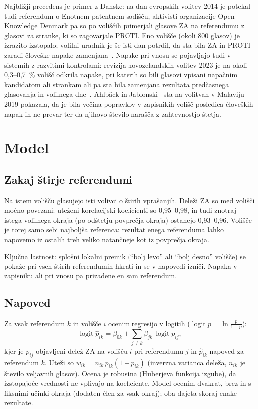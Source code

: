 \documentclass[11pt,a4paper]{article}
\begin{document}
Najbližji precedens je primer z Danske: na dan evropskih volitev 2014 je potekal tudi referendum o Enotnem patentnem sodišču, aktivisti organizacije Open Knowledge Denmark pa so po voliščih primerjali glasove ZA na referendumu z glasovi za stranke, ki so zagovarjale PROTI. Eno volišče (okoli 800 glasov) je izrazito izstopalo; volilni uradnik je še isti dan potrdil, da sta bila ZA in PROTI zaradi človeške napake zamenjana~\cite{okfn2014}. Napake pri vnosu se pojavljajo tudi v sistemih z razvitimi kontrolami: revizija novozelandskih volitev 2023 je na okoli 0,3--0,7~\% volišč odkrila napake, pri katerih so bili glasovi vpisani napačnim kandidatom ali strankam ali pa sta bila zamenjana rezultata predčasnega glasovanja in volilnega dne~\cite{oagnz2024}. Ahlbäck in Jablonski~\cite{ahlback2025} sta na volitvah v Malaviju 2019 pokazala, da je bila večina popravkov v zapisnikih volišč posledica človeških napak in ne prevar ter da njihovo število narašča z zahtevnostjo štetja.

\section{Model}

\subsection{Zakaj štirje referendumi}

Na istem volišču glasujejo isti volivci o štirih vprašanjih. Deleži ZA so med volišči močno povezani: uteženi korelacijski koeficienti so 0,95--0,98, in tudi znotraj istega volilnega okraja (po odštetju povprečja okraja) ostanejo 0,93--0,96. Volišče je torej samo sebi najboljša referenca: rezultat enega referenduma lahko napovemo iz ostalih treh veliko natančneje kot iz povprečja okraja.

Ključna lastnost: splošni lokalni premik (``bolj levo'' ali ``bolj desno'' volišče) se pokaže pri vseh štirih referendumih hkrati in se v napovedi izniči. Napaka v zapisniku ali pri vnosu pa prizadene en sam referendum.

\subsection{Napoved}

Za vsak referendum $k$ in volišče $i$ ocenim regresijo v logitih ($\operatorname{logit}p=\ln\frac{p}{1-p}$):
\begin{equation}
\operatorname{logit}\hat p_{ik} = \beta_{0k} + \sum_{j\neq k}\beta_{jk}\,\operatorname{logit} p_{ij},
\label{eq:model}
\end{equation}
kjer je $p_{ij}$ objavljeni delež ZA na volišču $i$ pri referendumu $j$ in $\hat p_{ik}$ napoved za referendum $k$. Uteži so $w_{ik}=n_{ik}\,p_{ik}(1-p_{ik})$ (inverzna varianca deleža, $n_{ik}$ je število veljavnih glasov). Ocena je robustna (Huberjeva funkcija izgube), da izstopajoče vrednosti ne vplivajo na koeficiente. Model ocenim dvakrat, brez in s fiksnimi učinki okraja (dodaten člen za vsak okraj); oba dajeta skoraj enake rezultate.
\end{document}
